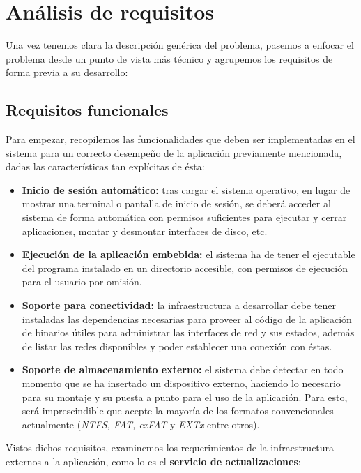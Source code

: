 \chapter{Análisis de requisitos}

Una vez tenemos clara la descripción genérica del problema, pasemos a enfocar el problema desde un punto de vista más técnico y agrupemos los requisitos de forma previa a su desarrollo:

\section{Requisitos funcionales}

Para empezar, recopilemos las funcionalidades que deben ser implementadas en el sistema para un correcto desempeño de la aplicación previamente mencionada, dadas las características tan explícitas de ésta:

\begin{itemize}
	\item \textbf{Inicio de sesión automático:} tras cargar el sistema operativo, en lugar de mostrar una terminal o pantalla de inicio de sesión, se deberá acceder al sistema de forma automática con permisos suficientes para ejecutar y cerrar aplicaciones, montar y desmontar interfaces de disco, etc.
	\item \textbf{Ejecución de la aplicación embebida:} el sistema ha de tener el ejecutable del programa instalado en un directorio accesible, con permisos de ejecución para el usuario por omisión.
	\item \textbf{Soporte para conectividad:} la infraestructura a desarrollar debe tener instaladas las dependencias necesarias para proveer al código de la aplicación de binarios útiles para administrar las interfaces de red y sus estados, además de listar las redes disponibles y poder establecer una conexión con éstas.
	\item \textbf{Soporte de almacenamiento externo:} el sistema debe detectar en todo momento que se ha insertado un dispositivo externo, haciendo lo necesario para su montaje y su puesta a punto para el uso de la aplicación. Para esto, será imprescindible que acepte la mayoría de los formatos convencionales actualmente (\textit{NTFS, FAT, exFAT} y \textit{EXTx} entre otros).
\end{itemize}

Vistos dichos requisitos, examinemos los requerimientos de la infraestructura externos a la aplicación, como lo es el \textbf{servicio de actualizaciones}:

